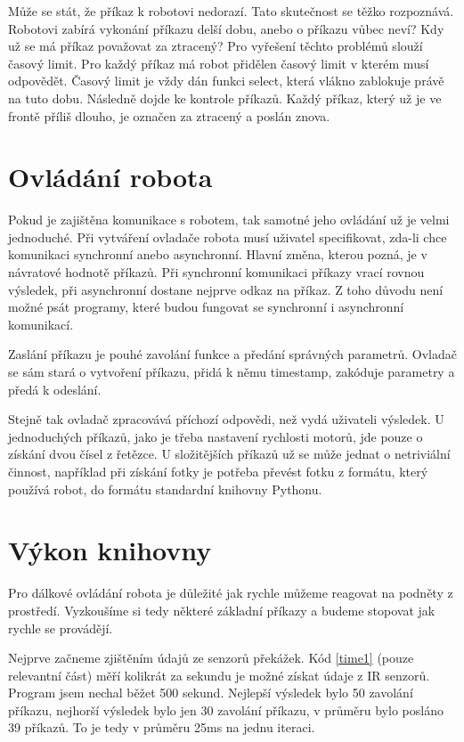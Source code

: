     Může se stát, že příkaz k robotovi nedorazí. Tato skutečnost se těžko
    rozpoznává. Robotovi zabírá vykonání příkazu delší dobu, anebo o příkazu
    vůbec neví? Kdy už se má příkaz považovat za ztracený? Pro vyřešení těchto
    problémů slouží časový limit. Pro každý příkaz má robot přidělen časový
    limit v kterém musí odpovědět. Časový limit je vždy dán funkci select,
    která vlákno zablokuje právě na tuto dobu. Následně dojde ke kontrole
    příkazů. Každý příkaz, který už je ve frontě příliš dlouho, je označen za
    ztracený a poslán znova.

    \section{Ovládání robota}
    \label{controller}

    Pokud je zajištěna komunikace s robotem, tak samotné jeho ovládání už je
    velmi jednoduché. Při vytváření ovladače robota musí uživatel specifikovat,
    zda-li chce komunikaci synchronní anebo asynchronní. Hlavní změna, kterou
    pozná, je v návratové hodnotě příkazů. Při synchronní komunikaci příkazy
    vrací rovnou výsledek, při asynchronní dostane nejprve odkaz na příkaz. Z
    toho důvodu není možné psát programy, které budou fungovat se synchronní i
    asynchronní komunikací.

    Zaslání příkazu je pouhé zavolání funkce a předání správných parametrů.
    Ovladač se sám stará o vytvoření příkazu, přidá k němu timestamp, zakóduje
    parametry a předá k odeslání.

    Stejně tak ovladač zpracovává příchozí odpovědi, než vydá uživateli
    výsledek. U jednoduchých příkazů, jako je třeba nastavení rychlosti motorů,
    jde pouze o získání dvou čísel z řetězce. U složitějších příkazů už se může
    jednat o netriviální činnost, například při získání fotky je potřeba
    převést fotku z formátu, který používá robot, do formátu standardní
    knihovny Pythonu.

    \section{Výkon knihovny}
    \label{benchmark}

    Pro dálkové ovládání robota je důležité jak rychle můžeme reagovat na
    podněty z prostředí. Vyzkoušíme si tedy některé základní příkazy a budeme
    stopovat jak rychle se provádějí.

    Nejprve začneme zjištěním údajů ze senzorů překážek. Kód \ref{time1} (pouze
    relevantní část) měří kolikrát za sekundu je možné získat údaje z IR
    senzorů. Program jsem nechal běžet 500 sekund. Nejlepší výsledek bylo 50
    zavolání příkazu, nejhorší výsledek bylo jen 30 zavolání příkazu, v průměru
    bylo posláno 39 příkazů. To je tedy v průměru 25ms na jednu iteraci.

